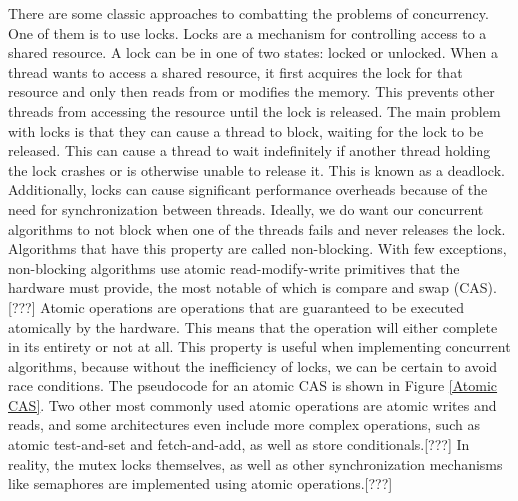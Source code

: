 \documentclass[oneside, a4paper, onecolumn, 10pt]{article}
\begin{document}
There are some classic approaches to combatting the problems of concurrency. One of them is to use locks. Locks are a mechanism for controlling access to a shared resource. A lock can be in one of two states: locked or unlocked. When a thread wants to access a shared resource, it first acquires the lock for that resource and only then reads from or modifies the memory. This prevents other threads from accessing the resource until the lock is released. The main problem with locks is that they can cause a thread to block, waiting for the lock to be released. This can cause a thread to wait indefinitely if another thread holding the lock crashes or is otherwise unable to release it. This is known as a deadlock. Additionally, locks can cause significant performance overheads because of the need for synchronization between threads.
Ideally, we do want our concurrent algorithms to not block when one of the threads fails and never releases the lock. Algorithms that have this property are called non-blocking. With few exceptions, non-blocking algorithms use atomic read-modify-write primitives that the hardware must provide, the most notable of which is compare and swap (CAS).[???] Atomic operations are operations that are guaranteed to be executed atomically by the hardware. This means that the operation will either complete in its entirety or not at all. This property is useful when implementing concurrent algorithms, because without the inefficiency of locks, we can be certain to avoid race conditions. The pseudocode for an atomic CAS is shown in Figure \ref{Atomic CAS}. Two other most commonly used atomic operations are atomic writes and reads, and some architectures even include more complex operations, such as atomic test-and-set and fetch-and-add, as well as store conditionals.[???] In reality, the mutex locks themselves, as well as other synchronization mechanisms like semaphores are implemented using atomic operations.[???]\\
\end{document}
